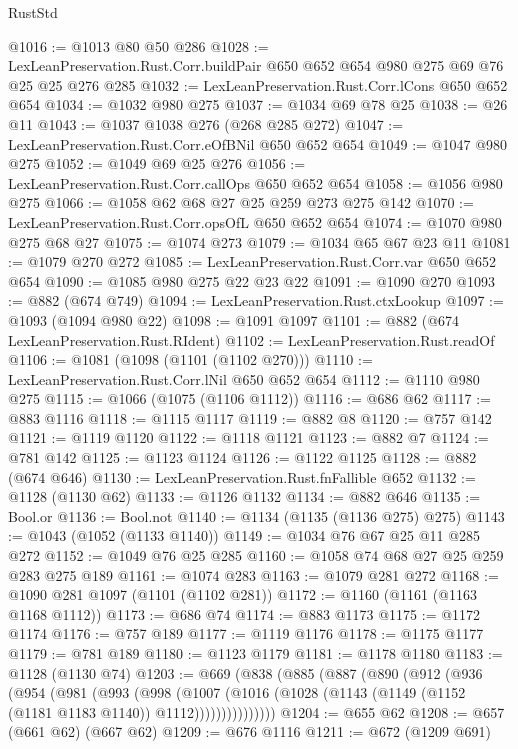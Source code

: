 \begin{lexlean}{RustStd}
\begin{coremodule}
@1016 := @1013 @80 @50 @286
@1028 := LexLeanPreservation.Rust.Corr.buildPair @650 @652 @654 @980 @275 @69 @76 @25 @25 @276 @285
@1032 := LexLeanPreservation.Rust.Corr.lCons @650 @652 @654
@1034 := @1032 @980 @275
@1037 := @1034 @69 @78 @25
@1038 := @26 @11
@1043 := @1037 @1038 @276 (@268 @285 @272)
@1047 := LexLeanPreservation.Rust.Corr.eOfBNil @650 @652 @654
@1049 := @1047 @980 @275
@1052 := @1049 @69 @25 @276
@1056 := LexLeanPreservation.Rust.Corr.callOps @650 @652 @654
@1058 := @1056 @980 @275
@1066 := @1058 @62 @68 @27 @25 @259 @273 @275 @142
@1070 := LexLeanPreservation.Rust.Corr.opsOfL @650 @652 @654
@1074 := @1070 @980 @275 @68 @27
@1075 := @1074 @273
@1079 := @1034 @65 @67 @23 @11
@1081 := @1079 @270 @272
@1085 := LexLeanPreservation.Rust.Corr.var @650 @652 @654
@1090 := @1085 @980 @275 @22 @23 @22
@1091 := @1090 @270
@1093 := @882 (@674 @749)
@1094 := LexLeanPreservation.Rust.ctxLookup
@1097 := @1093 (@1094 @980 @22)
@1098 := @1091 @1097
@1101 := @882 (@674 LexLeanPreservation.Rust.RIdent)
@1102 := LexLeanPreservation.Rust.readOf
@1106 := @1081 (@1098 (@1101 (@1102 @270)))
@1110 := LexLeanPreservation.Rust.Corr.lNil @650 @652 @654
@1112 := @1110 @980 @275
@1115 := @1066 (@1075 (@1106 @1112))
@1116 := @686 @62
@1117 := @883 @1116
@1118 := @1115 @1117
@1119 := @882 @8
@1120 := @757 @142
@1121 := @1119 @1120
@1122 := @1118 @1121
@1123 := @882 @7
@1124 := @781 @142
@1125 := @1123 @1124
@1126 := @1122 @1125
@1128 := @882 (@674 @646)
@1130 := LexLeanPreservation.Rust.fnFallible @652
@1132 := @1128 (@1130 @62)
@1133 := @1126 @1132
@1134 := @882 @646
@1135 := Bool.or
@1136 := Bool.not
@1140 := @1134 (@1135 (@1136 @275) @275)
@1143 := @1043 (@1052 (@1133 @1140))
@1149 := @1034 @76 @67 @25 @11 @285 @272
@1152 := @1049 @76 @25 @285
@1160 := @1058 @74 @68 @27 @25 @259 @283 @275 @189
@1161 := @1074 @283
@1163 := @1079 @281 @272
@1168 := @1090 @281 @1097 (@1101 (@1102 @281))
@1172 := @1160 (@1161 (@1163 @1168 @1112))
@1173 := @686 @74
@1174 := @883 @1173
@1175 := @1172 @1174
@1176 := @757 @189
@1177 := @1119 @1176
@1178 := @1175 @1177
@1179 := @781 @189
@1180 := @1123 @1179
@1181 := @1178 @1180
@1183 := @1128 (@1130 @74)
@1203 := @669
    (@838
      (@885
        (@887
          (@890
            (@912
              (@936
                (@954
                  (@981
                    (@993
                      (@998
                        (@1007
                          (@1016
                            (@1028 (@1143 (@1149 (@1152 (@1181 @1183 @1140)) @1112)))))))))))))))
@1204 := @655 @62
@1208 := @657 (@661 @62) (@667 @62)
@1209 := @676 @1116
@1211 := @672 (@1209 @691)

\end{coremodule}
\end{lexlean}
